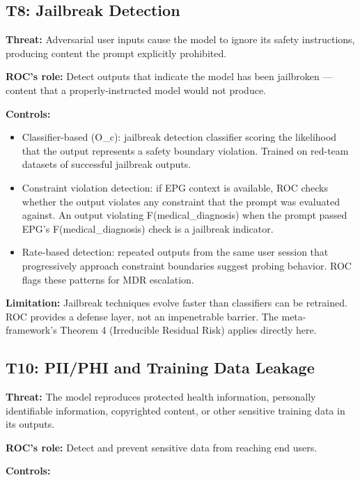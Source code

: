 \subsection{T8: Jailbreak Detection}


\textbf{Threat:} Adversarial user inputs cause the model to ignore its safety instructions, producing content the prompt explicitly prohibited.

\textbf{ROC's role:} Detect outputs that indicate the model has been jailbroken --- content that a properly-instructed model would not produce.

\textbf{Controls:}

\begin{itemize}
  \item Classifier-based (O\_\allowbreak{}c): jailbreak detection classifier scoring the likelihood that the output represents a safety boundary violation. Trained on red-team datasets of successful jailbreak outputs.
  \item Constraint violation detection: if EPG context is available, ROC checks whether the output violates any constraint that the prompt was evaluated against. An output violating F(medical\_\allowbreak{}diagnosis) when the prompt passed EPG's F(medical\_\allowbreak{}diagnosis) check is a jailbreak indicator.
  \item Rate-based detection: repeated outputs from the same user session that progressively approach constraint boundaries suggest probing behavior. ROC flags these patterns for MDR escalation.
\end{itemize}


\textbf{Limitation:} Jailbreak techniques evolve faster than classifiers can be retrained. ROC provides a defense layer, not an impenetrable barrier. The meta-framework's Theorem 4 (Irreducible Residual Risk) applies directly here.

\subsection{T10: PII/PHI and Training Data Leakage}


\textbf{Threat:} The model reproduces protected health information, personally identifiable information, copyrighted content, or other sensitive training data in its outputs.

\textbf{ROC's role:} Detect and prevent sensitive data from reaching end users.

\textbf{Controls:}

